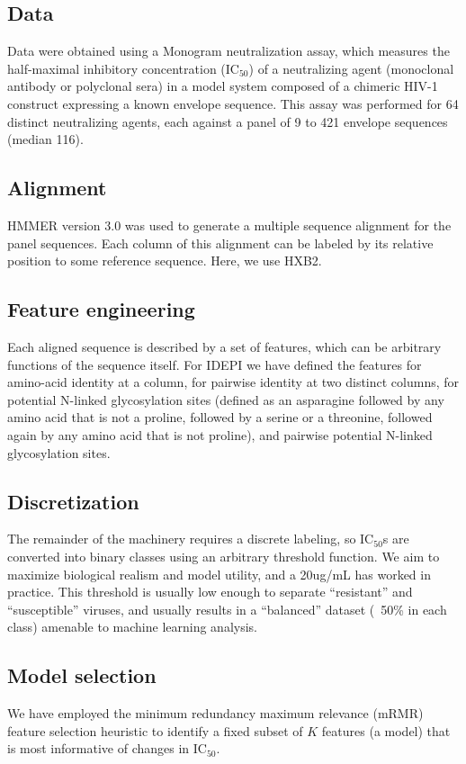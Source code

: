 \documentclass[10pt]{article}
\newcommand{\hmic}{{IC}$_{50}$}
\newcommand{\idepi}{{IDEPI}}
\newcommand{\hiv}{{HIV}-1}
\newcommand{\mrmr}{{mRMR}}
\begin{document}
\subsection*{Data}
Data were obtained using a Monogram neutralization assay,
which measures the half-maximal inhibitory concentration (\hmic{})
of a neutralizing agent (monoclonal antibody or polyclonal sera) in a model system composed of a chimeric \hiv{} construct expressing a known envelope sequence.
This assay was performed for 64 distinct neutralizing agents, each against a panel of 9 to 421 envelope sequences (median 116).

\subsection*{Alignment}
{HMMER} version 3.0 was used to generate a multiple sequence alignment for the panel sequences.
Each column of this alignment can be labeled by its relative position to some reference sequence.
Here, we use HXB2. 

\subsection*{Feature engineering}
Each aligned sequence is described by a set of features, which can be arbitrary functions of the sequence itself.
For \idepi{} we have defined the features for amino-acid identity at a column,
for pairwise identity at two distinct columns,
for potential N-linked glycosylation sites (defined as an asparagine followed by any amino acid that is not a proline, followed by a serine or a threonine, followed again by any amino acid that is not proline),
and pairwise potential N-linked glycosylation sites.

\subsection*{Discretization}
The remainder of the machinery requires a discrete labeling,
so \hmic{}s are converted into binary classes using an arbitrary threshold function.
We aim to maximize biological realism and model utility, and a 20ug/mL has worked in practice.
This threshold is usually low enough to separate ``resistant'' and ``susceptible'' viruses,
and usually results in a ``balanced'' dataset (~50\% in each class) amenable to machine learning analysis.

\subsection*{Model selection}
We have employed the minimum redundancy maximum relevance (\mrmr{}) feature selection heuristic to identify a fixed subset of $K$ features (a model) that is most informative of changes in \hmic{}.
\end{document}
